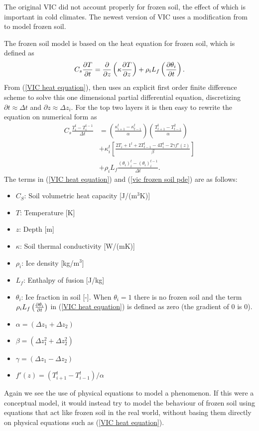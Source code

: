 The original VIC did not account 
properly for frozen soil, the effect of which is important in cold climates.
The newest version of VIC \citep{VIC5} uses a modification from \citet{VICFrozenSoil}
to model frozen soil. 

The frozen soil model is based on the heat equation for frozen soil, which 
is defined as 
\begin{equation}
C_s\pdv{T}{t}=\pdv{}{z}\left( \kappa \pdv{T}{z} \right) + \rho_i L_f \left( \pdv{\theta_i}{t}\right).
\label{VIC heat equation}
\end{equation}
From (\ref{VIC heat equation}), \citet{VICFrozenSoil} then uses an explicit first order 
finite difference scheme to solve this one dimensional partial differential 
equation, discretizing $\partial t\approx \Delta t$ and $\partial z \approx \Delta z_i$.
For the top two layers it is then easy to rewrite the equation on numerical form as
\begin{align}
	C_s\frac{T_i^t - T_i^{t-1}}{\Delta t} &= \left( \frac{\kappa_{i+1}^t - 
	\kappa_{t-1}^t}{\alpha}\right) \left( \frac{T_{t+1}^t - T_{t-1}^2}{\alpha} 
	\right)\nonumber \\ &+ \kappa_i^t \left[ \frac{2T_i+1^t + 2T_{t-1}^t - 4T_i^t - 2\gamma 
	f'(z)}{\beta}  \right] \nonumber \\ &+ \rho_i L_f \frac{(\theta_i)_i^t - 
    (\theta_i)_i^{t-1}}{\Delta t}. \label{vic frozen soil pde}
\end{align}
The terms in (\ref{VIC heat equation}) and (\ref{vic frozen soil pde}) are as follows:
\begin{itemize}
    \item $C_S$: Soil volumetric heat capacity [J/(m$^3$K)]
    \item $T$: Temperature [K]
    \item $z$: Depth [m]
    \item $\kappa$: Soil thermal conductivity [W/(mK)]
    \item $\rho_i$: Ice density [kg/m$^3$]
    \item $L_f$: Enthalpy of fusion [J/kg]
    \item $\theta_i$: Ice fraction in soil [-]. When $\theta_i=1$ there is no frozen soil and the term $\rho_i L_f\left( \pdv{\theta_i}{t}\right) $ in (\ref{VIC heat equation}) is defined as zero (the gradient of 0 is 0).
    \item $\alpha = (\Delta z_1 + \Delta z_2)$
    \item $\beta = (\Delta z_1^2 + \Delta z_2^2)$
    \item $\gamma = (\Delta z_1 - \Delta z_2)$
    \item $f'(z)=(T_{i+1}^t - T_{i-1}^t) / \alpha$
\end{itemize}
Again we see the use of physical equations to model a phenomenon. If this were a 
conceptual model, it would instead try to model the behaviour of frozen soil 
using equations that act like frozen soil in the real world, without basing 
them directly on physical equations such as (\ref{VIC heat equation}).

